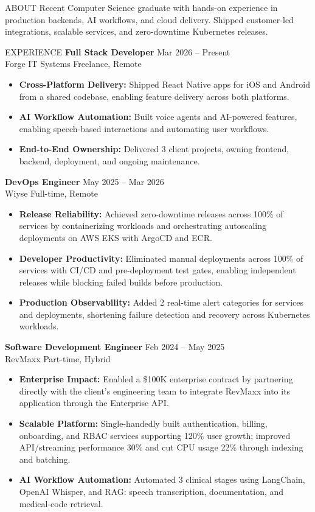 \documentclass{resume}
\begin{document}
\begin{rSection}{ABOUT}
	Recent Computer Science graduate with hands-on experience in production backends, AI workflows, and cloud delivery. Shipped customer-led integrations, scalable services, and zero-downtime Kubernetes releases.
\end{rSection}

\begin{rSection}{EXPERIENCE}
	\textbf{Full Stack Developer} \hfill Mar 2026 -- Present\\
	Forge IT Systems \hfill Freelance, Remote
	\begin{itemize}
		\item \textbf{Cross-Platform Delivery:} Shipped React Native apps for iOS and Android from a shared codebase, enabling feature delivery across both platforms.
		\item \textbf{AI Workflow Automation:} Built voice agents and AI-powered features, enabling speech-based interactions and automating user workflows.
		\item \textbf{End-to-End Ownership:} Delivered 3 client projects, owning frontend, backend, deployment, and ongoing maintenance.
	\end{itemize}
	\textbf{DevOps Engineer} \hfill May 2025 -- Mar 2026\\
	Wiyse \hfill Full-time, Remote
	\begin{itemize}
		\item \textbf{Release Reliability:} Achieved zero-downtime releases across 100\% of services by containerizing workloads and orchestrating autoscaling deployments on AWS EKS with ArgoCD and ECR.
		\item \textbf{Developer Productivity:} Eliminated manual deployments across 100\% of services with CI/CD and pre-deployment test gates, enabling independent releases while blocking failed builds before production.
		\item \textbf{Production Observability:} Added 2 real-time alert categories for services and deployments, shortening failure detection and recovery across Kubernetes workloads.
	\end{itemize}
	\textbf{Software Development Engineer} \hfill Feb 2024 -- May 2025\\
	RevMaxx \hfill Part-time, Hybrid
	\begin{itemize}
		\item \textbf{Enterprise Impact:} Enabled a \$100K enterprise contract by partnering directly with the client's engineering team to integrate RevMaxx into its application through the Enterprise API.
		\item \textbf{Scalable Platform:} Single-handedly built authentication, billing, onboarding, and RBAC services supporting 120\% user growth; improved API/streaming performance 30\% and cut CPU usage 22\% through indexing and batching.
		\item \textbf{AI Workflow Automation:} Automated 3 clinical stages using LangChain, OpenAI Whisper, and RAG: speech transcription, documentation, and medical-code retrieval.
	\end{itemize}
\end{rSection}
\end{document}
